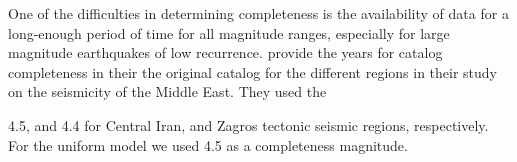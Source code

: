 One of the difficulties in determining completeness is the availability of data for a long-enough period of time for all magnitude ranges, especially for large magnitude earthquakes of low recurrence. \citet{Zare} provide the years for catalog completeness in their the original catalog for the different regions in their study on the seismicity of the Middle East. They used the 



4.5, and 4.4 for 
Central Iran, and Zagros tectonic seismic regions, respectively. For the uniform model we used 4.5 as a completeness magnitude.






